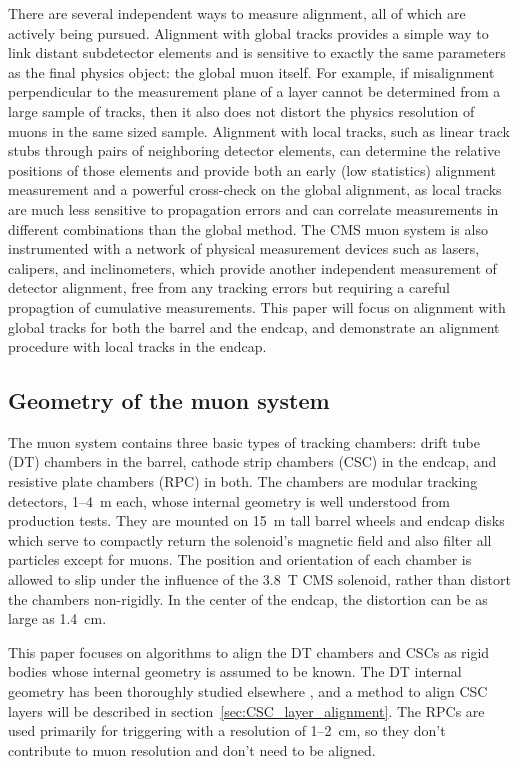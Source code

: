 \documentclass[12pt]{article}
\begin{document}
There are several independent ways to measure alignment, all of which
are actively being pursued.  Alignment with global tracks provides a
simple way to link distant subdetector elements and is sensitive to
exactly the same parameters as the final physics object: the global
muon itself.  For example, if misalignment perpendicular to the
measurement plane of a layer cannot be determined from a large sample
of tracks, then it also does not distort the physics resolution of
muons in the same sized sample.  Alignment with local tracks, such as
linear track stubs through pairs of neighboring detector elements, can
determine the relative positions of those elements and provide both an
early (low statistics) alignment measurement and a powerful
cross-check on the global alignment, as local tracks are much less
sensitive to propagation errors and can correlate measurements in
different combinations than the global method.  The CMS muon system is
also instrumented with a network of physical measurement devices such
as lasers, calipers, and inclinometers, which provide another
independent measurement of detector alignment, free from any tracking
errors but requiring a careful propagtion of cumulative measurements.
This paper will focus on alignment with global tracks for both the
barrel and the endcap, and demonstrate an alignment procedure with
local tracks in the endcap.

\subsection{Geometry of the muon system}

The muon system contains three basic types of tracking chambers: drift
tube (DT) chambers in the barrel, cathode strip chambers (CSC) in the
endcap, and resistive plate chambers (RPC) in both.  The chambers are
modular tracking detectors, 1--4~m each, whose internal geometry is
well understood from production tests.  They are mounted on 15~m tall
barrel wheels and endcap disks which serve to compactly return the
solenoid's magnetic field and also filter all particles except for
muons.  The position and orientation of each chamber is allowed to
slip under the influence of the 3.8~T CMS solenoid, rather than
distort the chambers non-rigidly.  In the center of the endcap, the
distortion can be as large as 1.4~cm.

This paper focuses on algorithms to align the DT chambers and CSCs as
rigid bodies whose internal geometry is assumed to be known.  The DT
internal geometry has been thoroughly studied
elsewhere \cite{internal_dt}, and a method to align CSC layers will be
described in section~\ref{sec:CSC_layer_alignment}.  The RPCs are used
primarily for triggering with a resolution of 1--2~cm, so they don't
contribute to muon resolution and don't need to be aligned.
\end{document}
